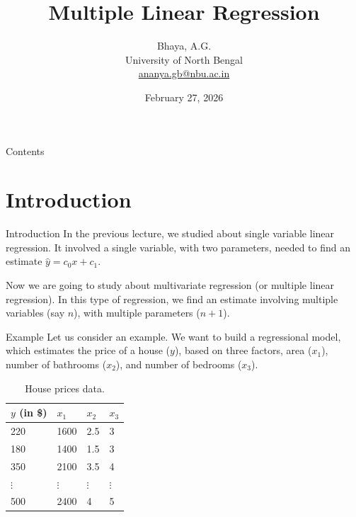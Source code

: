 \documentclass{beamer}
\title{Multiple Linear Regression}
\author[Bhaya, A.G.]{Bhaya, A.G.\\University of North Bengal\\ \href{mailto:angubh.io@gmail.com}{ananya.gb@nbu.ac.in}}
\date{February 27, 2026}
\begin{document}
    \begin{frame}
        \titlepage
    \end{frame}

    \begin{frame}{Contents}
        \tableofcontents
    \end{frame}

    \section{Introduction}
    \begin{frame}{Introduction}
        In the previous lecture, we studied about single variable linear regression. It involved a single variable, with two parameters, needed to find an estimate \(\hat{y}=c_0x+c_1\).

        Now we are going to study about multivariate regression (or multiple linear regression). In this type of regression, we find an estimate involving multiple variables (say \(n\)), with multiple parameters (\(n+1\)). 
    \end{frame}

    \begin{frame}{Example}
        Let us consider an example. We want to build a regressional model, which estimates the price of a house (\(y\)), based on three factors, area (\(x_1\)), number of bathrooms (\(x_2\)), and number of bedrooms (\(x_3\)).

        \begin{table}
            \centering
            \begin{tabularx}{0.75\textwidth}{|X|X|X|X|}
                \hline
                \(y\) (in \$) & \(x_1\) & \(x_2\) & \(x_3\)\\
                \hline
                220 & 1600 & 2.5 & 3\\
                180 & 1400 & 1.5 & 3\\
                350 & 2100 & 3.5 & 4\\
                \(\vdots\) & \(\vdots\) & \(\vdots\) & \(\vdots\)\\
                500 & 2400 & 4 & 5\\
                \hline
            \end{tabularx}
            \caption{House prices data.}
        \end{table}
    \end{frame}
\end{document}
